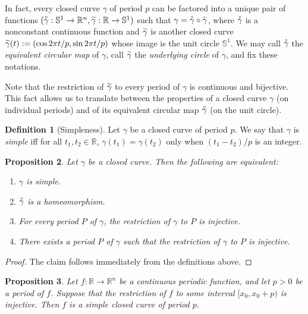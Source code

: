 \documentclass{amsart}
\newtheorem{proposition}{Proposition}[section]
\theoremstyle{definition}
\newtheorem{definition}[proposition]{Definition}
\theoremstyle{remark}
\newcommand{\lring}[1]{\accentset{\circ}{#1}}
\newcommand{\ltilde}[1]{\accentset{\sim}{#1}}
\begin{document}
In fact, every closed curve $\gamma$ of period $p$
can be factored into a unique pair of functions
$(\lring{\gamma}:\mathbb{S}^1\to\mathbb{R}^n,
    \ltilde{\gamma}:\mathbb{R}\to\mathbb{S}^1)$
such that $\gamma=\lring{\gamma}\circ\ltilde{\gamma}$,
where $\lring{\gamma}$ is a nonconstant continuous function
and $\ltilde{\gamma}$ is another closed curve
$\ltilde{\gamma}(t):=(\cos 2\pi t/p,\sin 2\pi t/p)$
whose image is the unit circle $\mathbb{S}^1$. We may call
$\lring{\gamma}$ the \emph{equivalent circular map} of $\gamma$,
call $\ltilde{\gamma}$ the \emph{underlying circle} of $\gamma$,
and fix these notations.

Note that the restriction of $\ltilde{\gamma}$ to
every period of $\gamma$ is continuous and bijective.
This fact allows us to translate between
the properties of a closed curve $\gamma$
(on individual periods) and of its equivalent circular map
$\lring{\gamma}$ (on the unit circle).

\begin{definition}[Simpleness]
    Let $\gamma$ be a closed curve of period $p$.
    We say that $\gamma$ is \emph{simple}
    iff for all $t_1,t_2\in\mathbb{R}$, $\gamma(t_1)=\gamma(t_2)$
    only when $(t_1-t_2)/p$ is an integer.
\end{definition}

\begin{proposition}
    \label{pro:simple_equiv}
    Let $\gamma$ be a closed curve.
    Then the following are equivalent:
    \begin{enumerate}
        \item $\gamma$ is simple.
        \item $\lring{\gamma}$ is a homeomorphism.
        \item For every period $P$ of $\gamma$, the restriction
              of $\gamma$ to $P$ is injective.
        \item There exists a period $P$ of $\gamma$ such that
              the restriction of $\gamma$ to $P$ is injective.
    \end{enumerate}
\end{proposition}

\begin{proof}
    The claim follows immediately from the definitions above.
\end{proof}

\begin{proposition}
    \label{pro:simple_suf_cond}
    Let $f:\mathbb{R}\to\mathbb{R}^n$
    be a continuous periodic function,
    and let $p>0$ be a period of $f$. Suppose that
    the restriction of $f$ to some interval $[x_0,x_0+p)$
    is injective.
    Then $f$ is a simple closed curve of period $p$.
\end{proposition}
\end{document}
